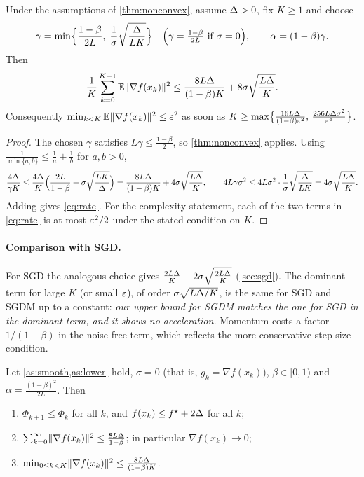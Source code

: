 \begin{corollary}\label{cor:rate}
Under the assumptions of \cref{thm:nonconvex}, assume $\Delta>0$, fix $K\ge1$ and choose
\[
  \gamma=\min\Bigl\{\frac{1-\beta}{2L},\;\frac1\sigma\sqrt{\frac{\Delta}{LK}}\Bigr\}
  \quad\Bigl(\gamma=\tfrac{1-\beta}{2L}\text{ if }\sigma=0\Bigr),
  \qquad\alpha=(1-\beta)\gamma .
\]
Then
\begin{equation}\label{eq:rate}
  \frac1K\sum_{k=0}^{K-1}\mathbb{E}\lVert \nabla f(x_k)\rVert^2\le\frac{8L\Delta}{(1-\beta)K}+8\sigma\sqrt{\frac{L\Delta}{K}} .
\end{equation}
Consequently $\min_{k<K}\mathbb{E}\lVert \nabla f(x_k)\rVert^2\le\varepsilon^2$ as soon as
$K\ge\max\bigl\{\frac{16L\Delta}{(1-\beta)\varepsilon^2},\,\frac{256L\Delta\sigma^2}{\varepsilon^4}\bigr\}$.
\end{corollary}

\begin{proof}
The chosen $\gamma$ satisfies $L\gamma\le\frac{1-\beta}2$, so \cref{thm:nonconvex}
applies. Using $\frac{1}{\min\{a,b\}}\le\frac1a+\frac1b$ for $a,b>0$,
\[
  \frac{4\Delta}{\gamma K}\le\frac{4\Delta}{K}\Bigl(\frac{2L}{1-\beta}+\sigma\sqrt{\frac{LK}{\Delta}}\Bigr)
  =\frac{8L\Delta}{(1-\beta)K}+4\sigma\sqrt{\frac{L\Delta}{K}},
  \qquad
  4L\gamma\sigma^2\le4L\sigma^2\cdot\frac1\sigma\sqrt{\frac{\Delta}{LK}}=4\sigma\sqrt{\frac{L\Delta}{K}} .
\]
Adding gives \eqref{eq:rate}. For the complexity statement, each of the two terms in
\eqref{eq:rate} is at most $\varepsilon^2/2$ under the stated condition on $K$.
\end{proof}

\paragraph{Comparison with SGD.} For SGD the analogous choice gives
$\frac{2L\Delta}{K}+2\sigma\sqrt{\frac{2L\Delta}{K}}$ (\cref{sec:sgd}). The dominant term for
large $K$ (or small $\varepsilon$), of order $\sigma\sqrt{L\Delta/K}$, is the same for SGD and SGDM
up to a constant: \emph{our upper bound for SGDM matches the one for SGD in the dominant
term, and it shows no acceleration.} Momentum costs a factor $1/(1-\beta)$ in the noise-free term, which
reflects the more conservative step-size condition.

\begin{corollary}\label{cor:deterministic}
Let \cref{as:smooth,as:lower} hold, $\sigma=0$ (that is, $g_k=\nabla f(x_k)$), $\beta\in[0,1)$
and $\alpha=\frac{(1-\beta)^2}{2L}$. Then
\begin{enumerate}[label=\textup{(\roman*)}]
\item $\Phi_{k+1}\le\Phi_k$ for all $k$, and $f(x_k)\le f^\star+2\Delta$ for all $k$;
\item $\sum_{k=0}^\infty\lVert \nabla f(x_k)\rVert^2\le\frac{8L\Delta}{1-\beta}$; in particular $\nabla f(x_k)\to0$;
\item $\min_{0\le k<K}\lVert \nabla f(x_k)\rVert^2\le\frac{8L\Delta}{(1-\beta)K}$.
\end{enumerate}
\end{corollary}

